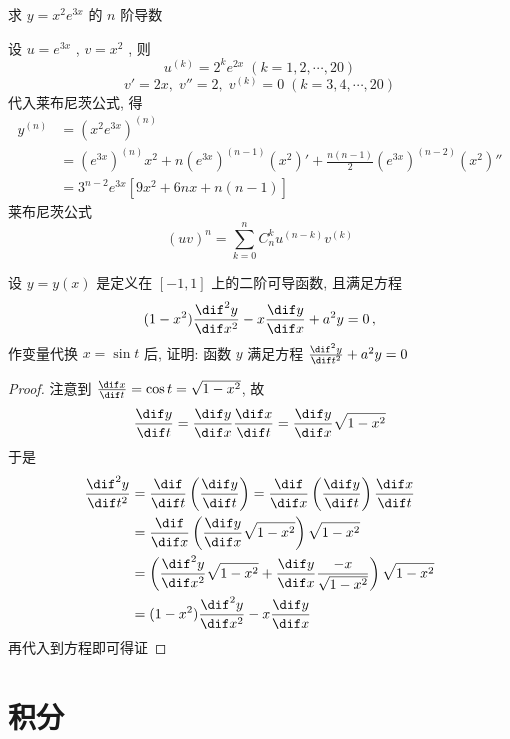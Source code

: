 \documentclass[color=green,titlestyle=hang]{elegantbook}%
\begin{document}
\begin{example}
求 $\displaystyle y=x^2e^{3x}$ 的 $\displaystyle n$ 阶导数\\[-3mm]
\end{example}\begin{solution}设 $\displaystyle u=e^{3x}$ , $\displaystyle v=x^2$ ,  则
\begin{equation*}u^{(k)}=2^ke^{2x}\;(k=1,2,\cdots,20)\end{equation*}
\begin{equation*}v'=2x,\;v''=2,\;v^{(k)}=0\;(k=3,4,\cdots,20)\end{equation*}
代入莱布尼茨公式, 得
\begin{align*}y^{(n)}&=(x^2e^{3x})^{(n)}\\
&=(e^{3x})^{(n)}x^2+n(e^{3x})^{(n-1)}(x^2)'+\frac{n(n-1)}{2}(e^{3x})^{(n-2)}(x^2)''\\
&=3^{n-2}e^{3x}\left[9x^2+6nx+n(n-1)\right]	
\end{align*}
莱布尼茨公式\begin{equation*}(uv)^{n}=\sum_{k=0}^{n}C_n^ku^{(n-k)}v^{(k)}\end{equation*}	
\end{solution}

\begin{example}
设 $y=y(x)$ 是定义在 $[-1,1]$ 上的二阶可导函数, 且满足方程
\[(1-x^2)\frac{\dif^2y}{\dif x^2}-x\frac{\dif y}{\dif x}+a^2y=0\,,\]
作变量代换 $x=\sin t$ 后, 证明: 函数 $y$ 满足方程 $\frac{\dif^2y}{\dif t^2}+a^2y=0$
\end{example}\begin{proof}
注意到 $\frac{\dif x}{\dif t}=\cos t=\sqrt{1-x^2}$, 故
\[\frac{\dif y}{\dif t}=\frac{\dif y}{\dif x}\frac{\dif x}{\dif t}=\frac{\dif y}{\dif x}\sqrt{1-x^2}\]
于是\begin{align*}
\frac{\dif^2y}{\dif t^2}&=\frac{\dif}{\dif t}\left(\frac{\dif y}{\dif t}\right)=\frac{\dif}{\dif x}\left(\frac{\dif y}{\dif t}\right)\frac{\dif x}{\dif t}\\
&=\frac{\dif}{\dif x}\left(\frac{\dif y}{\dif x}\sqrt{1-x^2}\right)\sqrt{1-x^2}\\
&=\left(\frac{\dif^2y}{\dif x^2}\sqrt{1-x^2}+\frac{\dif y}{\dif x}\frac{-x}{\sqrt{1-x^2}}\right)\sqrt{1-x^2}\\
&=(1-x^2)\frac{\dif^2y}{\dif x^2}-x\frac{\dif y}{\dif x}
\end{align*}
再代入到方程即可得证
\end{proof}

\chapter{积分}
\end{document}
